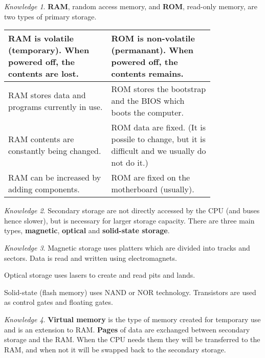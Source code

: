 \documentclass[8pt]{article}
\theoremstyle{remark}
\newtheorem{knowledge}{Knowledge}[subsection]
\begin{document}
            \begin{knowledge}
                \textbf{RAM}, random access memory, and \textbf{ROM}, read-only memory, are two types of primary storage.

                \begin{center}
                    \begin{tabular}{p{0.4\linewidth}|p{0.4\linewidth}}
                        RAM is volatile (temporary). When powered off, the contents are lost. & ROM is non-volatile (permanant). When powered off, the contents remains.\\\hline
                        RAM stores data and programs currently in use. & ROM stores the bootstrap and the BIOS which boots the computer.\\\hline
                        RAM contents are constantly being changed. & ROM data are fixed. (It is possile to change, but it is difficult and we usually do not do it.)\\\hline
                        RAM can be increased by adding components. & ROM are fixed on the motherboard (usually).
                    \end{tabular}
                \end{center}
            \end{knowledge}

            \begin{knowledge}
                Secondary storage are not directly accessed by the CPU (and buses hence slower), but is necessary for larger storage capacity. There are three main types, \textbf{magnetic}, \textbf{optical} and \textbf{solid-state storage}.
            \end{knowledge}

            \begin{knowledge}
                Magnetic storage uses platters which are divided into tracks and sectors. Data is read and written using electromagnets.
                
                Optical storage uses lasers to create and read pits and lands.
                
                Solid-state (flash memory) uses NAND or NOR technology. Transistors are used as control gates and floating gates.
            \end{knowledge}

            \begin{knowledge}
                \textbf{Virtual memory} is the type of memory created for temporary use and is an extension to RAM. \textbf{Pages} of data are exchanged between secondary storage and the RAM. When the CPU needs them they will be transferred to the RAM, and when not it will be swapped back to the secondary storage.
            \end{knowledge}
\end{document}
